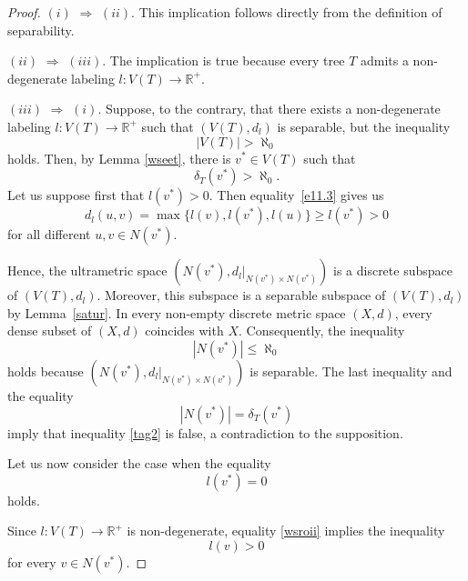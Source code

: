 \documentclass[pdflatex,sn-mathphys-num]{sn-jnl}%
\theoremstyle{thmstyletwo}%
\begin{document}
\begin{proof} 

$(i)$ $\Rightarrow$ $(ii)$. 
This implication follows directly from the definition of separability.

$(ii)$ $\Rightarrow$ $(iii)$.
The implication is true because every tree $T$ admits a non-degenerate labeling 
$l \colon V(T) \to \mathbb{R}^+$.

$(iii)$ $\Rightarrow$ $(i)$. Suppose, to the contrary, that there exists a non-degenerate labeling $l \colon V(T) \to \mathbb{R}^+$ such that $(V(T), d_l)$ is separable, but the inequality
\begin{equation*}
|V(T)| > \aleph_0
\end{equation*}
holds. Then, by Lemma \ref{wseet}, there is $v^* \in V(T)$ such that 
\begin{equation}
\label{tag2}
\delta_T(v^*) > \aleph_0. 
\end{equation}
Let us suppose first that $l(v^*) > 0$. Then equality~\eqref{e11.3} gives us
\begin{equation}\label{okjfe}
d_l(u,v) = \max \{ l(v), l(v^*), l(u) \} \geq  l(v^*)  > 0
\end{equation}
for all different $u, v \in N(v^*)$.



Hence, the ultrametric space $  (N(v^*), d_l|_{N(v^*) \times N(v^*)})$   is a discrete subspace of $(V(T), d_l)$.
Moreover, this subspace is a separable subspace of $(V(T), d_l)$ by Lemma~\ref{satur}.
In every non-empty discrete metric space $(X,d)$, every dense subset of $(X,d)$ coincides with
$X$. Consequently, the inequality
\begin{equation*}
|N(v^*)| \leq \aleph_0
\end{equation*}
holds because $  (N(v^*), d_l|_{N(v^*) \times N(v^*)})$ is separable.
The last inequality and the equality
\begin{equation*}
|N(v^*)| = \delta_T(v^*)
\end{equation*}
imply that inequality \eqref{tag2} is false, a contradiction to the supposition.

Let us now consider the case when the equality 
\begin{equation}\label{wsroii}
    l(v^*) = 0
\end{equation}
holds.

Since $l \colon V(T) \to \mathbb{R}^+$ is non-degenerate, equality \eqref{wsroii} 
implies the inequality 
\begin{equation}\label{e774}
    l(v) > 0
\end{equation}
for every $v \in N(v^*)$.


\end{proof}
\end{document}
